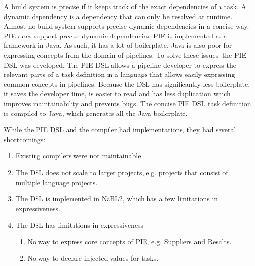A build system is precise if it keeps track of the exact dependencies of a task.
A dynamic dependency is a dependency that can only be resolved at runtime.
Almost no build system supports precise dynamic dependencies in a concise way.
\Ac{PIE} does support precise dynamic dependencies.
\Ac{PIE} is implemented as a framework in Java.
As such, it has a lot of boilerplate.
Java is also poor for expressing concepts from the domain of pipelines.
To solve these issues, the \ac{PIE} \ac{DSL} was developed.
The \ac{PIE} \ac{DSL} allows a pipeline developer to express the relevant parts of a task definition in a language that allows easily expressing common concepts in pipelines.
Because the \ac{DSL} has significantly less boilerplate, it saves the developer time, is easier to read and has less duplication which improves maintainability and prevents bugs. 
The concise \ac{PIE} \ac{DSL} task definition is compiled to Java, which generates all the Java boilerplate.

While the \ac{PIE} \ac{DSL} and the compiler had implementations, they had several shortcomings:
\begin{enumerate}
  \item Existing compilers were not maintainable.
  \item The \ac{DSL} does not scale to larger projects, e.g. projects that consist of multiple language projects.
  \item The \ac{DSL} is implemented in NaBL2, which has a few limitations in expressiveness.
  \item The \ac{DSL} has limitations in expressiveness
  \begin{enumerate}
    \item No way to express core concepts of \ac{PIE}, e.g. Suppliers and Results.
    \item No way to declare injected values for tasks.
  \end{enumerate}
\end{enumerate}

